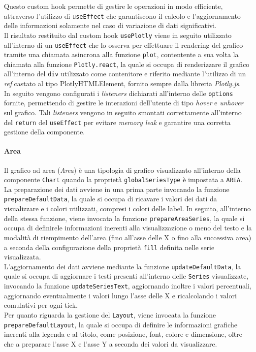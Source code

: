 Questo custom hook permette di gestire le operazioni in modo efficiente, attraverso l'utilizzo di \texttt{useEffect} che garantiscono il calcolo e l'aggiornamento delle informazioni
solamente nel caso di variazione di dati significativi. \\
Il risultato restituito dal custom hook \texttt{usePlotly} viene in seguito utilizzato all'interno di un \texttt{useEffect} che lo osserva per effettuare il rendering del grafico
tramite una chiamata asincrona alla funzione \texttt{plot}, contentente a sua volta la chiamata alla funzione \texttt{Plotly.react}, la quale si occupa di renderizzare il grafico all'interno del
\texttt{div} utilizzato come contenitore e riferito mediante l'utilizzo di un \textit{ref} castato al tipo {PlotlyHTMLElement}, fornito sempre dalla libreria \textit{Plotly.js}. \\
In seguito vengono configurati i \textit{listeners} dichiarati all'interno delle \texttt{options} fornite, permettendo di gestire le interazioni dell'utente di tipo \textit{hover} e \textit{unhover}
sul grafico. Tali \textit{listeners} vengono in seguito smontati correttamente all'interno del \texttt{return} del \texttt{useEffect} per evitare \textit{memory leak} e garantire una corretta gestione
della componente.

\paragraph{Area}
Il grafico ad area (\textit{Area}) è una tipologia di grafico visualizzato all'interno della componente \texttt{Chart} quando la proprietà \texttt{globalSeriesType} è impostata a \texttt{AREA}. \\
La preparazione dei dati avviene in una prima parte invocando la funzione \texttt{prepareDefaultData}, la quale si occupa di ricavare i valori dei dati da visualizzare e i colori utilizzati, compresi i
colori delle label. In seguito, all'interno della stessa funzione, viene invocata la funzione \texttt{prepareAreaSeries}, la quale si occupa di definirele informazioni inerenti alla visualizzazione o meno del testo
e la modalità di riempimento dell'area (fino all'asse delle X o fino alla successiva area) a seconda della configurazione della proprietà \texttt{fill} definita nelle serie visualizzata. \\
L'aggiornamento dei dati avviene mediante la funzione \texttt{updateDefaultData}, la quale si occupa di aggiornare i testi presenti all'interno delle \texttt{Series} visualizzate, invocando la funzione
\texttt{updateSeriesText}, aggiornando inoltre i valori percentuali, aggiornando eventualmente i valori lungo l'asse delle X e ricalcolando i valori comulativi per ogni tick. \\
Per quanto riguarda la gestione del \texttt{Layout}, viene invocata la funzione \texttt{prepareDefaultLayout}, la quale si occupa di definire le informazioni grafiche inerenti alla legenda e al titolo, come posizione,
font, colore e dimensione, oltre che a preparare l'asse X e l'asse Y a seconda dei valori da visualizzare.

